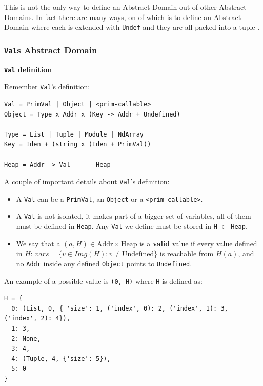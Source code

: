 \documentclass[
11pt, %
english, %
singlespacing, %
headsepline, %
]{MastersDoctoralThesis} %
\providecommand{\tightlist}{%
  \setlength{\itemsep}{0pt}\setlength{\parskip}{0pt}}
\begin{document}
This is not the only way to define an Abstract Domain out of other
Abstract Domains. In fact there are many ways, on of which is to define
an Abstract Domain where each is extended with \texttt{Undef} and they
are all packed into a tuple {}.

{}

\hypertarget{vals-abstract-domain}{%
\subsubsection{\texorpdfstring{\texttt{Val}s Abstract
Domain}{Vals Abstract Domain}}\label{vals-abstract-domain}}

\noindent \textbf{\texttt{Val} definition}

Remember \texttt{Val}'s definition:

\begin{verbatim}
Val = PrimVal | Object | <prim-callable>
Object = Type x Addr x (Key -> Addr + Undefined)

Type = List | Tuple | Module | NdArray
Key = Iden + (string x (Iden + PrimVal))

Heap = Addr -> Val    -- Heap
\end{verbatim}

A couple of important details about \texttt{Val}'s definition:

\begin{itemize}
\tightlist
\item
  A \texttt{Val} can be a \texttt{PrimVal}, an \texttt{Object} or a
  \texttt{\textless{}prim-callable\textgreater{}}.
\item
  A \texttt{Val} is not isolated, it makes part of a bigger set of
  variables, all of them must be defined in \texttt{Heap}. Any
  \texttt{Val} we define must be stored in \texttt{H} \(\in\)
  \texttt{Heap}.
\item
  We say that a \((a, H) \in \text{Addr} \times \text{Heap}\) is a
  \textbf{valid} value if every value defined in \(H\):
  \(vars = \{v \in Img(H) : v \ne \text{Undefined}\}\) is reachable from
  \(H(a)\), and no \texttt{Addr} inside any defined \texttt{Object}
  points to \texttt{Undefined}.
\end{itemize}

An example of a possible value is \texttt{(0,\ H)} where \texttt{H} is
defined as:

\begin{verbatim}
H = {
  0: (List, 0, { 'size': 1, ('index', 0): 2, ('index', 1): 3, ('index', 2): 4}),
  1: 3,
  2: None,
  3: 4,
  4: (Tuple, 4, {'size': 5}),
  5: 0
}
\end{verbatim}
\end{document}
